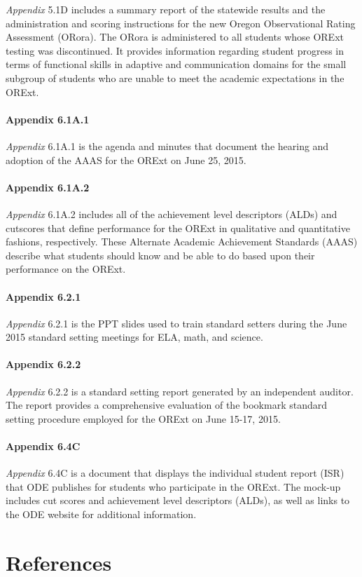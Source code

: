 \documentclass[]{article}
\let\oldparagraph\paragraph
\renewcommand{\paragraph}[1]{\oldparagraph{#1}\mbox{}}
\begin{document}
\emph{Appendix} 5.1D includes a summary report of the statewide results
and the administration and scoring instructions for the new Oregon
Observational Rating Assessment (ORora). The ORora is administered to
all students whose ORExt testing was discontinued. It provides
information regarding student progress in terms of functional skills in
adaptive and communication domains for the small subgroup of students
who are unable to meet the academic expectations in the ORExt.

\paragraph{Appendix 6.1A.1}\label{appendix-6.1a.1}

\emph{Appendix} 6.1A.1 is the agenda and minutes that document the
hearing and adoption of the AAAS for the ORExt on June 25, 2015.

\paragraph{Appendix 6.1A.2}\label{appendix-6.1a.2}

\emph{Appendix} 6.1A.2 includes all of the achievement level descriptors
(ALDs) and cutscores that define performance for the ORExt in
qualitative and quantitative fashions, respectively. These Alternate
Academic Achievement Standards (AAAS) describe what students should know
and be able to do based upon their performance on the ORExt.

\paragraph{Appendix 6.2.1}\label{appendix-6.2.1}

\emph{Appendix} 6.2.1 is the PPT slides used to train standard setters
during the June 2015 standard setting meetings for ELA, math, and
science.

\paragraph{Appendix 6.2.2}\label{appendix-6.2.2}

\emph{Appendix} 6.2.2 is a standard setting report generated by an
independent auditor. The report provides a comprehensive evaluation of
the bookmark standard setting procedure employed for the ORExt on June
15-17, 2015.

\paragraph{Appendix 6.4C}\label{appendix-6.4c}

\emph{Appendix} 6.4C is a document that displays the individual student
report (ISR) that ODE publishes for students who participate in the
ORExt. The mock-up includes cut scores and achievement level descriptors
(ALDs), as well as links to the ODE website for additional information.

\newpage

\section{References}\label{references}
\end{document}
